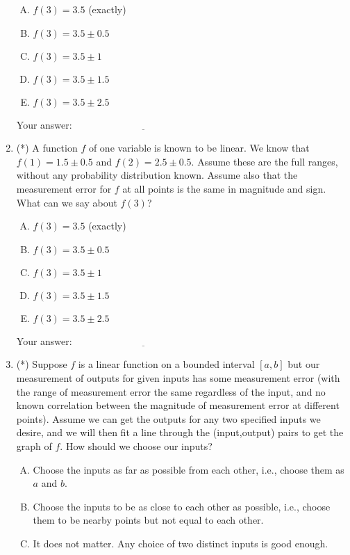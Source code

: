 \documentclass[10pt]{amsart}
\begin{document}
\begin{enumerate}
  \begin{enumerate}[(A)]
  \item $f(3) = 3.5$ (exactly)
  \item $f(3) = 3.5 \pm 0.5$
  \item $f(3) = 3.5 \pm 1$
  \item $f(3) = 3.5 \pm 1.5$
  \item $f(3) = 3.5 \pm 2.5$
  \end{enumerate}

  \vspace{0.1in}
  Your answer: $\underline{\qquad\qquad\qquad\qquad\qquad\qquad\qquad}$
  \vspace{0.1in}

\item (*) A function $f$ of one variable is known to be linear. We know
  that $f(1) = 1.5 \pm 0.5$ and $f(2) = 2.5 \pm 0.5$. Assume these are
  the full ranges, without any probability distribution known. Assume
  also that the measurement error for $f$ at all points is the same in
  magnitude and sign. What can we say about $f(3)$?

  \begin{enumerate}[(A)]
  \item $f(3) = 3.5$ (exactly)
  \item $f(3) = 3.5 \pm 0.5$
  \item $f(3) = 3.5 \pm 1$
  \item $f(3) = 3.5 \pm 1.5$
  \item $f(3) = 3.5 \pm 2.5$
  \end{enumerate}

  \vspace{0.1in}
  Your answer: $\underline{\qquad\qquad\qquad\qquad\qquad\qquad\qquad}$
  \vspace{0.1in}

\item (*) Suppose $f$ is a linear function on a bounded interval $[a,b]$
  but our measurement of outputs for given inputs has some measurement
  error (with the range of measurement error the same regardless of
  the input, and no known correlation between the magnitude of
  measurement error at different points). Assume we can get the
  outputs for any two specified inputs we desire, and we will then fit
  a line through the (input,output) pairs to get the graph of $f$. How
  should we choose our inputs?

  \begin{enumerate}[(A)]
  \item Choose the inputs as far as possible from each other, i.e.,
    choose them as $a$ and $b$.
  \item Choose the inputs to be as close to each other as possible,
    i.e., choose them to be nearby points but not equal to each other.
  \item It does not matter. Any choice of two distinct inputs is good
    enough.
  \end{enumerate}


\end{enumerate}
\end{document}
